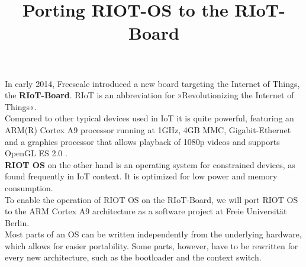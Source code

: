 \documentclass[conference,a4paper]{IEEEtran}
\begin{document}
\title{Porting RIOT-OS to the RIoT-Board}

\author{
\and
{}
}

\maketitle


\IEEEpeerreviewmaketitle

In early 2014, Freescale introduced a new board targeting the Internet of 
Things, the \textbf{RIoT-Board}. RIoT is an abbreviation for »Revolutionizing 
the Internet of Things«.\\
Compared to other typical devices used in IoT it is quite powerful, featuring 
an ARM(R) Cortex A9 processor running at 1GHz, 4GB MMC, Gigabit-Ethernet and a 
graphics processor that allows playback of 1080p videos and supports OpenGL ES 
2.0 .\\
\textbf{RIOT OS} on the other hand is an operating system for constrained 
devices, as found frequently in IoT context. It is optimized for low power and 
memory consumption.\\
To enable the operation of RIOT OS on the RIoT-Board, we will port RIOT OS to 
the ARM Cortex A9 architecture as a software project at Freie Universität 
Berlin.\\

Most parts of an OS can be written independently from the underlying hardware, 
which allows for easier portability. Some parts, however, have to be rewritten 
for every new architecture, such as the bootloader and the context switch.\\
\end{document}

